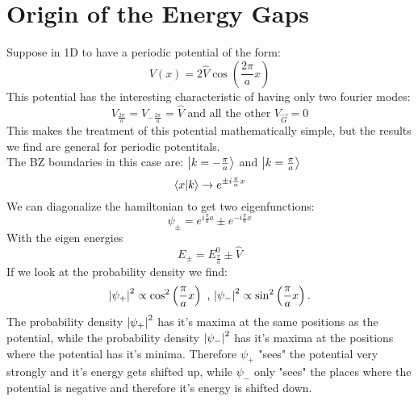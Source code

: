 \documentclass{report}
\begin{document}
\section{Origin of the Energy Gaps}
Suppose in 1D to have a periodic potential of the form: \[
	V(x) = 2 \hat{V} \cos\left( \frac{2\pi}{a} x \right) 
\] This potential has the interesting characteristic of having only two fourier modes: \[
V_{\frac{2\pi}{a}} = V_{-\frac{2\pi}{a}} = \hat{V} \text{ and all the other } V_{\vec{G}} = 0
\] This makes the treatment of this potential mathematically simple, but the results we find are general for periodic potentitals.\\
The BZ boundaries in this case are: $\ket{k = -\frac{\pi}{a}} $ and $\ket{k = \frac{\pi}{a}} $\[
	\bra{x} \ket{k}  \to e^{\pm i\frac{\pi}{a}x}
\] We can diagonalize the hamiltonian to get two eigenfunctions: \[
\psi_\pm = e^{i\frac{\pi}{a}a} \pm e^{-i \frac{\pi}{a}x}
\] With the eigen energies \[
E_\pm = E_{\frac{\pi}{a}}^0 \pm \hat{V}
\] If we look at the probability density we find: \[
\abs{\psi_+}^2 \propto \cos^2\left( \frac{\pi}{a} x \right) \text{ , } \abs{\psi_-}^2 \propto \sin^2\left( \frac{\pi}{a}x \right)  
.\]   
The probability density $\abs{\psi_+}^2$ has it's maxima at the same positions as the potential, while the probability density $\abs{\psi_-}^2$ has it's maxima at the positions where the potential has it's minima. Therefore $\psi_+$ "sees" the potential very strongly and it's energy gets shifted up, while $\psi_-$ only "sees" the places where the potential is negative and therefore it's energy is shifted down.\\
\end{document}
